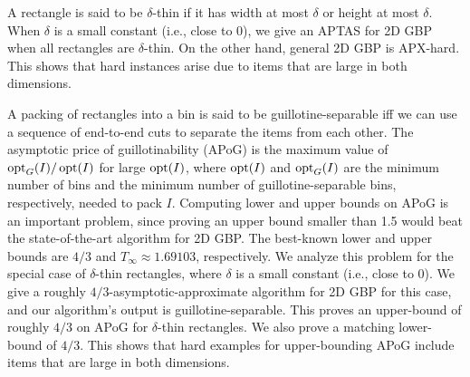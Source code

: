 A rectangle is said to be $\delta$-thin if it has
width at most $\delta$ or height at most $\delta$.
When $\delta$ is a small constant (i.e., close to 0), we give an APTAS for 2D GBP
when all rectangles are $\delta$-thin.
On the other hand, general 2D GBP is APX-hard.
This shows that hard instances arise due to items
that are large in both dimensions.

A packing of rectangles into a bin is said to be guillotine-separable iff
we can use a sequence of end-to-end cuts to separate the items from each other.
The asymptotic price of guillotinability (APoG) is the maximum
value of $\operatorname{opt}_G(I)/\operatorname{opt}(I)$ for large $\operatorname{opt}(I)$, where
$\operatorname{opt}(I)$ and $\operatorname{opt}_G(I)$ are the minimum number of bins and
the minimum number of guillotine-separable bins, respectively, needed to pack $I$.
Computing lower and upper bounds on APoG is an important problem,
since proving an upper bound smaller than 1.5 would beat
the state-of-the-art algorithm for 2D GBP.
The best-known lower and upper bounds are
$4/3$ and $T_{\infty} \approx 1.69103$, respectively.
We analyze this problem for the special case of $\delta$-thin rectangles,
where $\delta$ is a small constant (i.e., close to 0).
We give a roughly $4/3$-asymptotic-approximate algorithm for
2D GBP for this case, and our algorithm's output is guillotine-separable.
This proves an upper-bound of roughly $4/3$ on APoG for $\delta$-thin rectangles.
We also prove a matching lower-bound of $4/3$.
This shows that hard examples for upper-bounding APoG
include items that are large in both dimensions.
